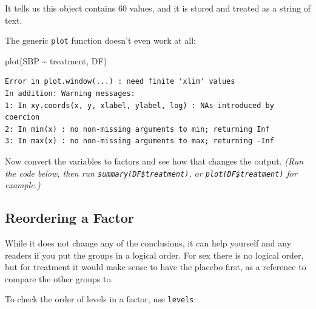 \documentclass[
]{book}
\newenvironment{Shaded}{\begin{snugshade}}{\end{snugshade}}
\newcommand{\FunctionTok}[1]{\textcolor[rgb]{0.00,0.00,0.00}{#1}}
\newcommand{\NormalTok}[1]{#1}
\newcommand{\OtherTok}[1]{\textcolor[rgb]{0.56,0.35,0.01}{#1}}
\newcommand{\SpecialCharTok}[1]{\textcolor[rgb]{0.00,0.00,0.00}{#1}}
\begin{document}
It tells us this object contains 60 values, and it is stored and treated as a string of text.

The generic \texttt{plot} function doesn't even work at all:

\begin{Shaded}
\begin{Highlighting}[]
\FunctionTok{plot}\NormalTok{(SBP }\SpecialCharTok{\textasciitilde{}}\NormalTok{ treatment, DF)}
\end{Highlighting}
\end{Shaded}

\begin{verbatim}
Error in plot.window(...) : need finite 'xlim' values
In addition: Warning messages:
1: In xy.coords(x, y, xlabel, ylabel, log) : NAs introduced by coercion
2: In min(x) : no non-missing arguments to min; returning Inf
3: In max(x) : no non-missing arguments to max; returning -Inf
\end{verbatim}

Now convert the variables to factors and see how that changes the output. \emph{(Run the code below, then run \texttt{summary(DF\$treatment)}, or \texttt{plot(DF\$treatment)} for example.)}

\begin{Shaded}
\end{Shaded}

\hypertarget{reordering-a-factor}{%
\subsection*{Reordering a Factor}\label{reordering-a-factor}}

While it does not change any of the conclusions, it can help yourself and any readers if you put the groups in a logical order. For sex there is no logical order, but for treatment it would make sense to have the placebo first, as a reference to compare the other groups to.

To check the order of levels in a factor, use \texttt{levels}:
\end{document}
